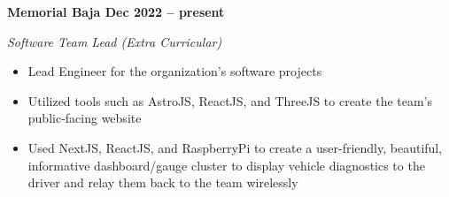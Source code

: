 \vspace{0.1cm}
\textbf{Memorial Baja \hfill Dec 2022 -- present} \par
\textit{Software Team Lead (Extra Curricular)} \par
\begin{itemize}
    \item Lead Engineer for the organization's software projects
    \item Utilized tools such as AstroJS, ReactJS, and ThreeJS to create the team's public-facing website
    \item Used NextJS, ReactJS, and RaspberryPi to create a user-friendly, beautiful, informative dashboard/gauge cluster to display vehicle diagnostics to the driver and relay them back to the team wirelessly 
\end{itemize} \par